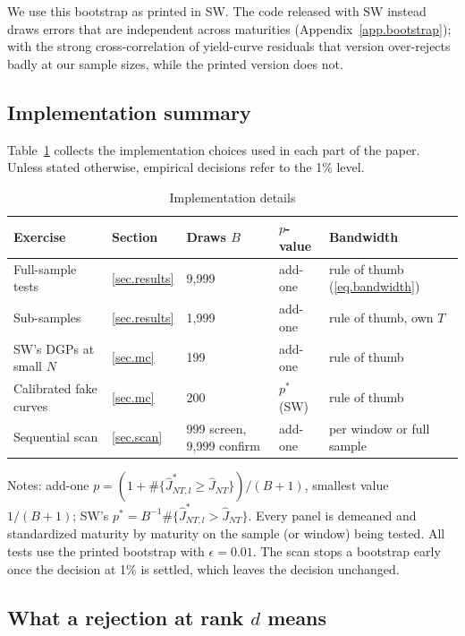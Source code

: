 \documentclass[11pt]{article}
\begin{document}
We use this bootstrap as printed in SW. The code released with SW instead draws errors that are independent across maturities (Appendix~\ref{app.bootstrap}); with the strong cross-correlation of yield-curve residuals that version over-rejects badly at our sample sizes, while the printed version does not.

\subsection{Implementation summary}

Table~\ref{tab.impl} collects the implementation choices used in each part of the paper. Unless stated otherwise, empirical decisions refer to the 1\% level.

\begin{table}[htbp]
\centering
\small
\begin{threeparttable}
\caption{Implementation details}\label{tab.impl}
\begin{tabular}{lllll}
\toprule
Exercise & Section & Draws $B$ & $p$-value & Bandwidth\\
\midrule
Full-sample tests & \ref{sec.results} & 9,999 & add-one & rule of thumb (\ref{eq.bandwidth})\\
Sub-samples & \ref{sec.results} & 1,999 & add-one & rule of thumb, own $T$\\
SW's DGPs at small $N$ & \ref{sec.mc} & 199 & add-one & rule of thumb\\
Calibrated fake curves & \ref{sec.mc} & 200 & $p^*$ (SW) & rule of thumb\\
Sequential scan & \ref{sec.scan} & 999 screen, 9,999 confirm & add-one & per window or full sample\\
\bottomrule
\end{tabular}
\begin{tablenotes}\small
\item Notes: add-one $p=(1+\#\{\hat J^*_{NT,l}\ge\hat J_{NT}\})/(B+1)$, smallest value $1/(B+1)$; SW's $p^*=B^{-1}\#\{\hat J^*_{NT,l}>\hat J_{NT}\}$. Every panel is demeaned and standardized maturity by maturity on the sample (or window) being tested. All tests use the printed bootstrap with $\epsilon=0.01$. The scan stops a bootstrap early once the decision at 1\% is settled, which leaves the decision unchanged.
\end{tablenotes}
\end{threeparttable}
\end{table}

\subsection{What a rejection at rank $d$ means}
\end{document}
